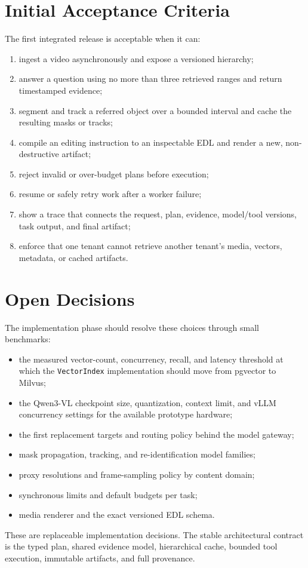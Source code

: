 \documentclass[11pt]{article}
\newcommand{\code}[1]{\texttt{#1}}
\begin{document}
\section{Initial Acceptance Criteria}

The first integrated release is acceptable when it can:

\begin{enumerate}
  \item ingest a video asynchronously and expose a versioned hierarchy;
  \item answer a question using no more than three retrieved ranges and return
  timestamped evidence;
  \item segment and track a referred object over a bounded interval and cache the
  resulting masks or tracks;
  \item compile an editing instruction to an inspectable EDL and render a new,
  non-destructive artifact;
  \item reject invalid or over-budget plans before execution;
  \item resume or safely retry work after a worker failure;
  \item show a trace that connects the request, plan, evidence, model/tool
  versions, task output, and final artifact;
  \item enforce that one tenant cannot retrieve another tenant's media, vectors,
  metadata, or cached artifacts.
\end{enumerate}

\section{Open Decisions}

The implementation phase should resolve these choices through small benchmarks:

\begin{itemize}
  \item the measured vector-count, concurrency, recall, and latency threshold at
  which the \code{VectorIndex} implementation should move from pgvector to Milvus;
  \item the Qwen3-VL checkpoint size, quantization, context limit, and vLLM
  concurrency settings for the available prototype hardware;
  \item the first replacement targets and routing policy behind the model gateway;
  \item mask propagation, tracking, and re-identification model families;
  \item proxy resolutions and frame-sampling policy by content domain;
  \item synchronous limits and default budgets per task;
  \item media renderer and the exact versioned EDL schema.
\end{itemize}

These are replaceable implementation decisions. The stable architectural
contract is the typed plan, shared evidence model, hierarchical cache, bounded
tool execution, immutable artifacts, and full provenance.
\end{document}
